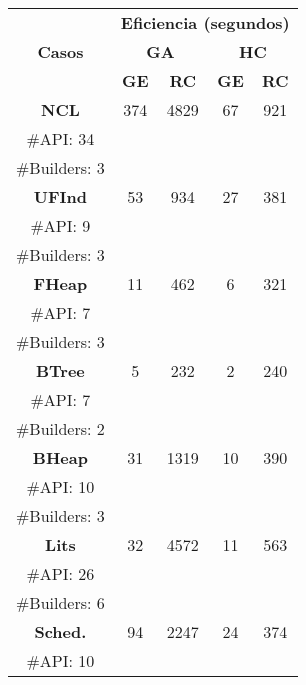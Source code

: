 \begin{table}[H]
\centering
\label{tab:t1}
\scriptsize
\begin{tabular}{cccccc}
\midrule
\multicolumn{2}{c}{\multirow{3}{*}{\textbf{Casos}}} & \multicolumn{4}{c}{\textbf{Eficiencia (segundos)}} \\
\cline{3-6}
\multicolumn{2}{c}{} & \multicolumn{2}{c}{\textbf{GA}} & \multicolumn{2}{c}{\textbf{HC}} \\
\multicolumn{2}{c}{} & \textbf{\tiny{GE}} & \textbf{\tiny{RC}} & \textbf{\tiny{GE}} & \textbf{\tiny{RC}} \\
\midrule
\multicolumn{2}{c}{\textbf{NCL}} & 374  & 4829  & 67  &921     \\
\multicolumn{2}{c}{\tiny \#API: 34} &  &   & &   \\
\multicolumn{2}{c}{\tiny \#Builders: 3} &  &   & &    \\
\midrule
\multicolumn{2}{c}{\textbf{UFInd}} & 53  & 934  & 27  &381    \\
\multicolumn{2}{c}{\tiny \#API: 9} &  &   & &  \\
\multicolumn{2}{c}{\tiny \#Builders: 3} &  &   & &  \\
\midrule
\multicolumn{2}{c}{\textbf{FHeap}} & 11  & 462  & 6  &321    \\
\multicolumn{2}{c}{\tiny \#API: 7} &  &   & &   \\
\multicolumn{2}{c}{\tiny \#Builders: 3} &  &   & &  \\
\midrule
\multicolumn{2}{c}{\textbf{BTree}} &  5 &  232 & 2  & 240  \\
\multicolumn{2}{c}{\tiny \#API: 7} &  &   & &  \\
\multicolumn{2}{c}{\tiny \#Builders: 2} &  &   & &   \\
\midrule
\multicolumn{2}{c}{\textbf{BHeap}} & 31 &  1319 & 10 & 390  \\
\multicolumn{2}{c}{\tiny \#API: 10} &  &   & &   \\
\multicolumn{2}{c}{\tiny \#Builders: 3} &  &   & &   \\
\midrule
\multicolumn{2}{c}{\textbf{Lits}} & 32  & 4572  & 11  &  563   \\
\multicolumn{2}{c}{\tiny \#API: 26} &  &   & &   \\
\multicolumn{2}{c}{\tiny \#Builders: 6} &  &   & &   \\
\midrule
\multicolumn{2}{c}{\textbf{Sched.}} &   94& 2247  & 24  & 374     \\
\multicolumn{2}{c}{\tiny \#API: 10} &  &   & &    \\

\end{tabular}
\end{table}
